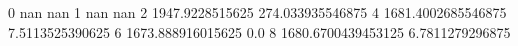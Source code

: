 0 nan nan
1 nan nan
2 1947.9228515625 274.033935546875
4 1681.4002685546875 7.5113525390625
6 1673.888916015625 0.0
8 1680.6700439453125 6.7811279296875
